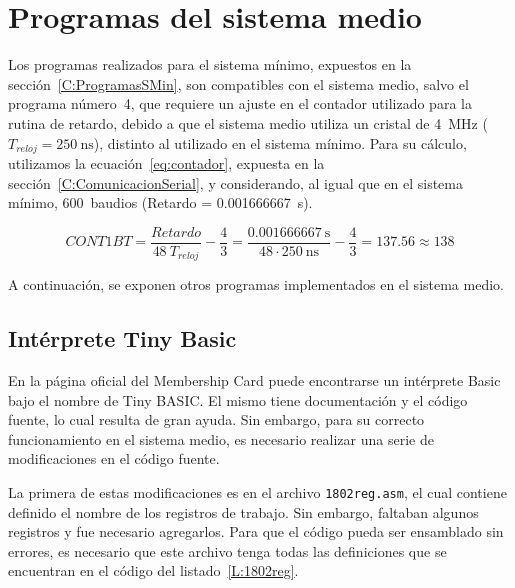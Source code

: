 \clearpage
\section{Programas del sistema medio}
\label{C:programas_del_sistema_medio}

Los programas realizados para el sistema mínimo, expuestos en la sección~\ref{C:ProgramasSMin}, son compatibles con el sistema medio, salvo el programa número~4, que requiere un ajuste en el contador utilizado para la rutina de retardo, debido a que el sistema medio utiliza un cristal de 4~\si{\mega\hertz} ($ T_{reloj} = \num{250}~\si{\nano\second} $), distinto al utilizado en el sistema mínimo. Para su cálculo, utilizamos la ecuación~\eqref{eq:contador}, expuesta en la sección~\ref{C:ComunicacionSerial}, y considerando, al igual que en el sistema mínimo, 600~baudios (Retardo = \num{0.001666667}~\si{\second}).

\begin{equation}
    CONT1BT = \frac{Retardo}{48\:T_{reloj}}-\frac{4}{3} = \frac{\num{0.001666667}~\si{\second}}{48\cdot\num{250}~\si{\nano\second}}-\frac{4}{3} = \num{137.56}\approx\num{138}
    \label{eq:calculo-1-bit-time-sistema-med}
\end{equation}

A continuación, se exponen otros programas implementados en el sistema medio.

\subsection{Intérprete Tiny Basic}

En la página oficial del Membership Card\cite{membership-card} puede encontrarse un intérprete Basic bajo el nombre de Tiny BASIC. El mismo tiene documentación y el código fuente, lo cual resulta de gran ayuda. Sin embargo, para su correcto funcionamiento en el sistema medio, es necesario realizar una serie de modificaciones en el código fuente.

La primera de estas modificaciones es en el archivo \texttt{1802reg.asm}, el cual contiene definido el nombre de los registros de trabajo. Sin embargo, faltaban algunos registros y fue necesario agregarlos. Para que el código pueda ser ensamblado sin errores, es necesario que este archivo tenga todas las definiciones que se encuentran en el código del listado~\ref{L:1802reg}.

\clearpage
\footnotesize

\normalsize

